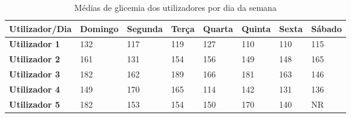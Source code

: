 \begin{table}[H]
\centering
\begin{adjustbox}{max width=\textwidth}


\begin{tabular}{|l|l|l|l|l|l|l|l|}
\hline
\rowcolor[HTML]{C0C0C0} 
{\color[HTML]{000000} \textbf{Utilizador/Dia}} & {\color[HTML]{000000} \textbf{Domingo}} & {\color[HTML]{000000} \textbf{Segunda}} & {\color[HTML]{000000} \textbf{Terça}} & {\color[HTML]{000000} \textbf{Quarta}} & {\color[HTML]{000000} \textbf{Quinta}} & {\color[HTML]{000000} \textbf{Sexta}} & {\color[HTML]{000000} \textbf{Sábado}} \\ \hline
\rowcolor[HTML]{FFFFFF} 
\cellcolor[HTML]{C0C0C0}\textbf{Utilizador 1}  & 132                                     & 117                                     & 119                                   & 127                                    & 110                                    & 110                                   & 115                                    \\ \hline
\rowcolor[HTML]{FFFFFF} 
\cellcolor[HTML]{C0C0C0}\textbf{Utilizador 2}  & 161                                     & 131                                     & 154                                   & 156                                    & 149                                    & 148                                   & 165                                    \\ \hline
\rowcolor[HTML]{FFFFFF} 
\cellcolor[HTML]{C0C0C0}\textbf{Utilizador 3}  & 182                                     & 162                                     & 189                                   & 166                                    & 181                                    & 163                                   & 146                                    \\ \hline
\rowcolor[HTML]{FFFFFF} 
\cellcolor[HTML]{C0C0C0}\textbf{Utilizador 4}  & 149                                     & 170                                     & 165                                   & 114                                    & 142                                    & 131                                   & 136                                    \\ \hline
\rowcolor[HTML]{FFFFFF} 
\cellcolor[HTML]{C0C0C0}\textbf{Utilizador 5}  & 182                                     & 153                                     & 154                                   & 150                                    & 170                                    & 140                                   & NR                                     \\ \hline
\end{tabular}
\end{adjustbox}

\caption{Médias de glicemia dos utilizadores por dia da semana}
\label{tab:dias}
\end{table}
